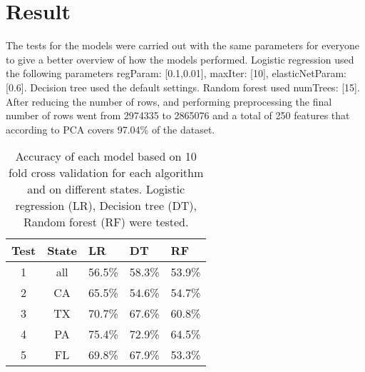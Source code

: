 \documentclass[../main.tex]{subfiles}
\begin{document}
\section{Result}
The tests for the models were carried out with the same parameters for everyone to give a better overview of how the models performed. Logistic regression used the following parameters regParam: [0.1,0.01], maxIter: [10], elasticNetParam: [0.6]. Decision tree used the default settings. Random forest used numTrees: [15]. After reducing the number of rows, and performing preprocessing the final number of rows went from 2974335 to 2865076 and a total of 250 features that according to PCA covers 97.04\% of the dataset.

\begin{table}[H]
\centering
\begin{tabular}{ccccc}
\hline
\multicolumn{1}{l}{\textbf{Test}} & \multicolumn{1}{l}{\textbf{State}} &   \multicolumn{1}{l}{\textbf{LR}} & 
\multicolumn{1}{l}{\textbf{DT}} & 
\multicolumn{1}{l}{\textbf{RF}} \\ \hline
1 & all & 56.5\% & 58.3\% & 53.9\% \\ \hline
2 & CA & 65.5\% & 54.6\% & 54.7\%  \\ \hline
3 & TX & 70.7\% & 67.6\% & 60.8\%  \\ \hline
4 & PA & 75.4\% & 72.9\% & 64.5\%  \\ \hline
5 & FL & 69.8\% & 67.9\% & 53.3\%  \\ \hline
\end{tabular}
\caption{Accuracy of each model based on 10 fold cross validation for each algorithm and on different states. Logistic regression (LR), Decision tree (DT), Random forest (RF) were tested.}
\label{tab:result_params}
\end{table}
\end{document}
